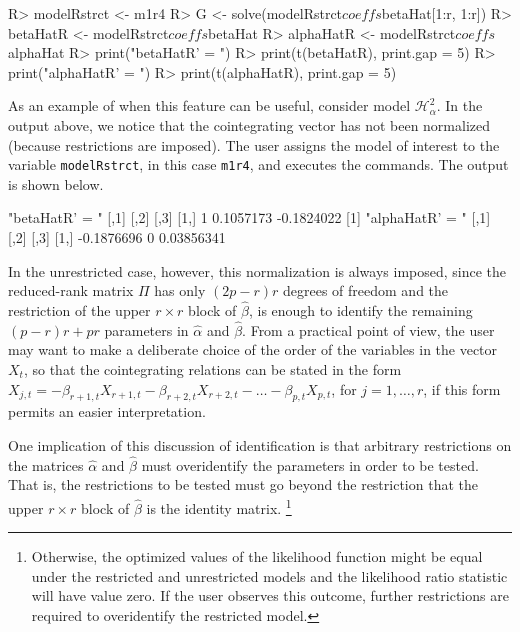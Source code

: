 \documentclass[article]{jss}
\begin{document}
\begin{CodeChunk} 
\begin{CodeInput}
R> modelRstrct <- m1r4
R> G <- solve(modelRstrct$coeffs$betaHat[1:r, 1:r])
R> betaHatR <- modelRstrct$coeffs$betaHat %
R> alphaHatR <- modelRstrct$coeffs$alphaHat %
R> print("betaHatR' = ")
R> print(t(betaHatR), print.gap = 5)
R> print("alphaHatR' = ")
R> print(t(alphaHatR), print.gap = 5)
\end{CodeInput}
\end{CodeChunk}  


As an example of when this feature can be useful, consider model $\mathscr{H}_{\alpha}^2$. In the output above, we notice that the cointegrating vector has not been normalized (because restrictions are imposed). The user assigns the model of interest to the variable \verb|modelRstrct|, in this case \verb|m1r4|, and executes the commands. The output is shown below.

\begin{CodeChunk} 
\begin{CodeOutput}
[1] "betaHatR' = "
         [,1]          [,2]           [,3]
[1,]        1     0.1057173     -0.1824022
[1] "alphaHatR' = "
               [,1]     [,2]           [,3]
[1,]     -0.1876696        0     0.03856341
\end{CodeOutput}
\end{CodeChunk}  



In the unrestricted case, however, this normalization is always imposed, since the reduced-rank matrix $\Pi$
has only $(2p - r)r$ degrees of freedom and the restriction of the upper $r \times r$ block of $\hat{\beta}$, 
is enough to identify the remaining $(p - r)r + pr$ parameters in $\hat{\alpha}$ and $\hat{\beta}$. 
From a practical point of view, the user may want to make a deliberate choice 
of the order of the variables in the vector $X_{t}$, so that the cointegrating relations can be stated in the form
$X_{j,t} = - \beta_{r+1, t}X_{r+1,t} - \beta_{r+2, t}X_{r+2,t} - \dots - \beta_{p, t}X_{p,t}$, 
for $j = 1, \dots, r$,
if this form permits an easier interpretation. 

One implication of this discussion of identification is that 
arbitrary restrictions on the matrices $\hat{\alpha}$ and $\hat{\beta}$
must overidentify the parameters in order to be tested. 
That is, the restrictions to be tested must go beyond the restriction that 
the upper $r \times r$ block of $\hat{\beta}$ is the identity matrix.%
\footnote{
Otherwise, the optimized values of the likelihood function might be equal 
under the restricted and unrestricted models 
and the likelihood ratio statistic will have value zero. 
If the user observes this outcome, further restrictions are required to overidentify the restricted model.}
\end{document}
